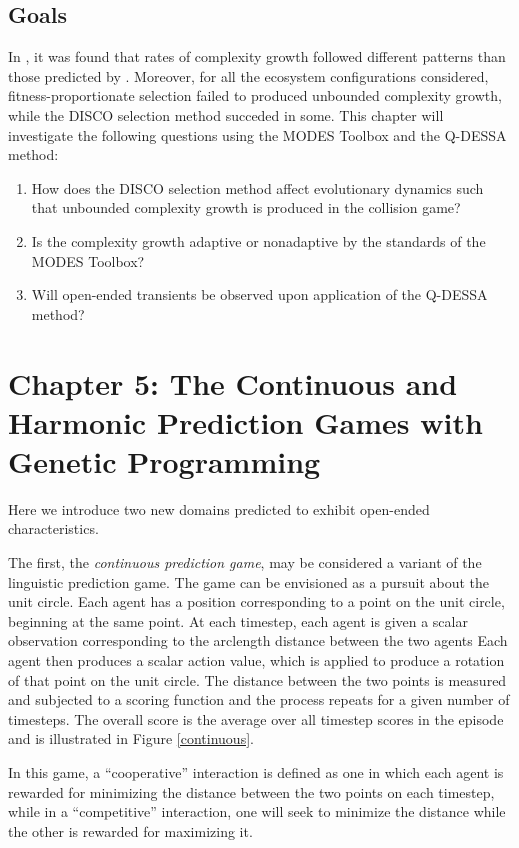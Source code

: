 \documentclass{article}
\begin{document}
\subsection*{Goals}
In \citet{willkens2022}, it was found that rates of complexity growth followed different 
patterns than those predicted by \citet{moran2019evolving}. Moreover, for all the ecosystem
configurations considered, fitness-proportionate selection failed to produced unbounded
complexity growth, while the DISCO selection method succeded in some. This chapter will investigate the
following questions using the MODES Toolbox and the Q-DESSA method:
\begin{enumerate}
    \item How does the DISCO selection method affect evolutionary dynamics such that 
        unbounded complexity growth is produced in the collision game?
    \item Is the complexity growth adaptive or nonadaptive by the standards of the MODES Toolbox?
    \item Will open-ended transients be observed upon application of the Q-DESSA method?
\end{enumerate}

\section*{Chapter 5: The Continuous and Harmonic Prediction Games with Genetic Programming}
Here we introduce two new domains predicted to exhibit open-ended characteristics. 

The first, the \textit{continuous prediction game}, may be considered a variant of the linguistic
prediction game. The game can be envisioned as a pursuit about the unit circle. Each agent has a
position corresponding to a point on the unit circle, beginning at the same point. At each timestep,
each agent is given a scalar observation corresponding to the arclength distance between the two agents
Each agent then produces a scalar action value, which is applied to produce a rotation of that point
on the unit circle. The distance between the two points is measured and subjected to a scoring function 
and the process repeats for a given number of timesteps. The overall score is the average over 
all timestep scores in the episode and is illustrated in Figure \ref{continuous}.

In this game, a ``cooperative'' interaction is defined as one in which each agent is rewarded for minimizing the
distance between the two points on each timestep, while in a ``competitive'' interaction, one
will seek to minimize the distance while the other is rewarded for maximizing it. 
\end{document}
